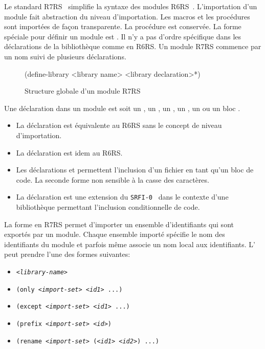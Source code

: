 Le standard R7RS~\cite{Scheme:R7RS} simplifie la syntaxe des modules
R6RS~\cite{Scheme:R6RS}.  L'importation d'un module fait abstraction du niveau
d'importation. Les macros et les procédures sont importées de façon
transparente. La procédure  est conservée. La forme spéciale pour
définir un module est . Il n'y a pas d'ordre spécifique
dans les déclarations de la bibliothèque comme en R6RS. Un module R7RS commence par
un nom suivi de plusieurs déclarations.\\[1ex]
\begin{figure}[ht]
  \centering
  \begin{mplisting}{0.5}
(define-library <library name>
  <library declaration>*)
\end{mplisting}
  \caption{Structure globale d'un module R7RS}
  \label{fig:syntax->define-library}
\end{figure}

Une déclaration dans un module est soit un , un ,
un , un , un  ou un
bloc .
\begin{itemize}
  \item La déclaration  est équivalente au R6RS sans le concept
    de niveau d'importation.

  \item La déclaration  est idem au R6RS.

  \item Les déclarations  et  permettent
    l'inclusion d'un fichier en tant qu'un bloc de code.  La seconde forme
    non sensible à la casse des caractères.

  \item La déclaration  est une extension du
    \texttt{SRFI-0}~\cite{SRFI-0} dans le contexte d'une bibliothèque
    permettant l'inclusion conditionnelle de code.

\end{itemize}

La forme  en R7RS permet d'importer un ensemble d'identifiants
qui sont exportés par un module. Chaque ensemble importé spécifie le nom des
identifiants du module et parfois même associe un nom local aux identifiants.
L' peut prendre l'une des formes suivantes:
\begin{itemize}
  \label{itm:import-set}
  \item \texttt{\textit{<library-name>}}
  \item \texttt{(only \textit{<import-set>} \textit{<id1>} ...)}
  \item \texttt{(except \textit{<import-set>} \textit{<id1>} ...)}
  \item \texttt{(prefix \textit{<import-set>} \textit{<id>})}
  \item \texttt{(rename \textit{<import-set>} (\textit{<id1>} \textit{<id2>}) ...)}
\end{itemize}


